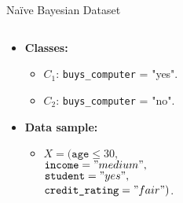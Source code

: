 \begin{frame}{Naïve Bayesian Dataset}
	\begin{columns}
		\begin{column}{0.4\textwidth}
			\vspace{-2cm}
			\begin{itemize}
				\item \textbf{Classes:}
				      \begin{itemize}
					      \item $C_1$: \texttt{buys\_computer} = "yes".
					      \item $C_2$: \texttt{buys\_computer} = "no".
				      \end{itemize}
				\item \textbf{Data sample:}
				      \begin{itemize}
					      \item $X = (\texttt{age} \leq 30,$ \\
					            $\texttt{income} = "medium",$ \\
					            $\texttt{student} = "yes",$\\
					            $\texttt{credit\_rating} = "fair")$.
				      \end{itemize}
			\end{itemize}
		\end{column}
		\begin{column}{0.6\textwidth}
			\resizebox{\columnwidth}{!}{%
				
			}
		\end{column}
	\end{columns}
\end{frame}

